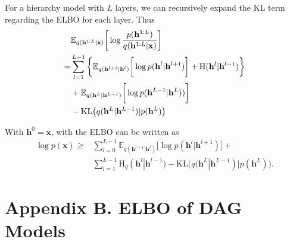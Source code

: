 \documentclass[conference]{IEEEtran}
\begin{document}
For a hierarchy model with $L$ layers, we can recursively expand the KL term regarding the ELBO for each layer.  Thus 
\begin{align} \label{eq:KL_all}
& \mathbb{E}_{q(\mathbf{h}^{1:L} | \mathbf{x})} \bigg[ \log  \frac{p( \mathbf{h}^{1:L})}{q(\mathbf{h}^{1:L}|\mathbf{x})}  \bigg] \\ \notag
=& \sum_{l=1}^{L-1} \bigg\{   \mathbb{E}_{q(\mathbf{h}^{l+1}|\mathbf{h}^l)} \bigg[ \log p( \mathbf{h}^{l}|  \mathbf{h}^{l+1})   \bigg]  +    \text{H}(\mathbf{h}^l | \mathbf{h}^{l-1} )  \bigg\}\\ \notag
&+  \mathbb{E}_{q(\mathbf{h}^L|\mathbf{h}^{L-1})} \bigg[ \log p( \mathbf{h}^{L-1}|  \mathbf{h}^L) )  \bigg]   \\ \notag
&-   \text{KL}\big(q(\mathbf{h}^L | \mathbf{h}^{L-1} )   | p(\mathbf{h}^L)  \big)
 \end{align}

With $\mathbf{h}^0 = \mathbf{x}$,  with the ELBO can be written as 
\begin{align*}
\log p(\mathbf{x}) \geq &   \sum_{l=0}^{L-1}  \mathbb{E}_{q(\mathbf{h}^{l+1}|\mathbf{h}^l)} \bigg[ \log p( \mathbf{h}^{l}|  \mathbf{h}^{l+1})   \bigg] + \\
& \sum_{l=1}^{L-1}   \text{H}_q(\mathbf{h}^l | \mathbf{h}^{l-1} ) -   \text{KL}\big(q(\mathbf{h}^L | \mathbf{h}^{L-1} )   | p(\mathbf{h}^L)  \big) . 
 \end{align*}

\section*{Appendix B.  ELBO of DAG Models}\label{appd:dag_elbo}
\end{document}
